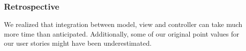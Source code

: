 \subsubsection{Retrospective}
We realized that integration between model, view and controller can take much more time than anticipated. Additionally, some of our original point values for our user stories might have been underestimated.




